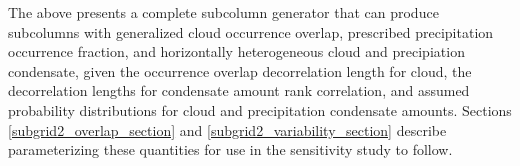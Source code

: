 
The above presents a complete subcolumn generator that can produce subcolumns with generalized cloud occurrence overlap, prescribed precipitation occurrence fraction, and horizontally heterogeneous cloud and precipiation condensate, given the occurrence overlap decorrelation length for cloud, the decorrelation lengths for condensate amount rank correlation, and assumed probability distributions for cloud and precipitation condensate amounts. Sections \ref{subgrid2_overlap_section} and \ref{subgrid2_variability_section} describe parameterizing these quantities for use in the sensitivity study to follow.


